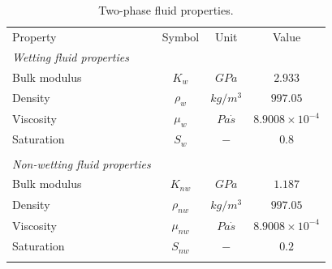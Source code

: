 \begin{table}[!t]
\begin{center}
\begin{tabular}{lccc}
\hline\noalign{\smallskip}
Property & Symbol & Unit & Value \\
\noalign{\smallskip}\hline\noalign{\smallskip}
\textit{Wetting fluid properties} &          &        & \\
Bulk modulus   & $K_{w}$       & $GPa$       & $2.933$ \\
Density        & $\rho _{w} $  & $kg/m^3$    & $997.05$ \\
Viscosity      & $\mu _{w} $   & $Pa\dot s$  & $8.9008\times 10^{-4}$ \\
Saturation     & $S_{w}$       & $-$         & $0.8$ \\
\\
\textit{Non-wetting fluid properties} &               &               &  \\
Bulk modulus   & $K_{nw}$        & $GPa$       & $1.187$ \\
Density        & $\rho _{nw} $   & $kg/m^3$    & $997.05$ \\
Viscosity      & $\mu _{nw} $    & $Pa\dot s$  & $8.9008\times 10^{-4}$ \\
Saturation     & $S_{nw}$        & $-$         & $0.2$ \\
\noalign{\smallskip}\hline
\end{tabular}
\end{center}
\caption{Two-phase fluid properties.}
\label{terz:tab4}
\end{table}

